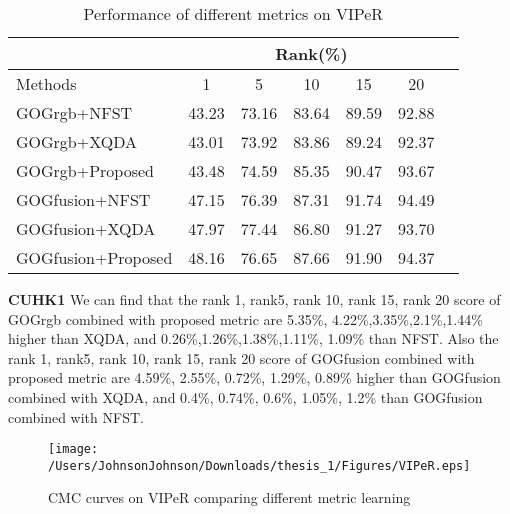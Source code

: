 \begin{table}[H]
\caption{Performance of different metrics on VIPeR}
\centering
 \begin{tabular}{|l|c|c|c|c|c|c|}
\hline
& \multicolumn{5}{|c|}{Rank(\%)} \\
\hline
Methods& 1 & 5 &10& 15&20\\
\hline
GOGrgb+NFST& 43.23&73.16 &83.64 & 89.59&92.88\\  
\hline
GOGrgb+XQDA& 43.01&73.92&83.86& 89.24& 92.37\\
\hline
GOGrgb+Proposed&43.48&74.59&85.35&90.47&93.67\\   %
\hline
GOGfusion+NFST&47.15& 76.39&87.31&91.74&94.49\\
\hline
GOGfusion+XQDA& 47.97& 77.44& 86.80& 91.27&93.70\\  
\hline
GOGfusion+Proposed&48.16& 76.65&87.66&91.90&94.37\\ %

\hline

\end{tabular}
\end{table}
\textbf{CUHK1} We can find that the rank 1, rank5, rank 10, rank 15, rank 20 score of GOGrgb combined with proposed metric are 5.35\%, 4.22\%,3.35\%,2.1\%,1.44\% higher than XQDA, and 0.26\%,1.26\%,1.38\%,1.11\%, 1.09\% than NFST.  Also the  rank 1, rank5, rank 10, rank 15, rank 20 score of GOGfusion combined with proposed metric are 4.59\%, 2.55\%, 0.72\%, 1.29\%, 0.89\% higher than GOGfusion combined with XQDA, and 0.4\%, 0.74\%, 0.6\%, 1.05\%, 1.2\% than GOGfusion combined with NFST. 

\begin{figure}[H]
\begin{raggedleft}
\texttt{[image: /Users/JohnsonJohnson/Downloads/thesis\_1/Figures/VIPeR.eps]}
\vspace{-3em}
\caption{CMC curves on VIPeR comparing different metric learning}
\end{raggedleft}
\end{figure}

